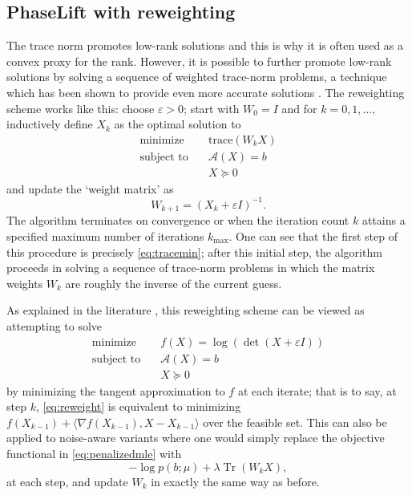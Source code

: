 \documentclass[11pt]{article}
\newcommand{\<}{\langle}
\renewcommand{\>}{\rangle}
\newcommand{\cA}{\mathcal{A}}
\newcommand{\trace}{\operatorname{Tr}}
\numberwithin{equation}{section}
\renewcommand{\epsilon}{\varepsilon}
\begin{document}
\subsection{PhaseLift with reweighting}
\label{sec:reweight}

The trace norm promotes low-rank solutions and this is why it is often
used as a convex proxy for the rank. However, it is possible to
further promote low-rank solutions by solving a sequence
of weighted trace-norm problems, a technique which has been shown to
provide even more accurate solutions \cite{FHB03,CWB07}. The
reweighting scheme works like this: choose $\epsilon > 0$; start with
$W_0 = I$ and for $k = 0, 1, \ldots,$ inductively define $X_k$ as the
optimal solution to
\begin{equation}
\label{eq:reweight}
 \begin{array}{ll}
    \text{minimize}   & \quad \text{trace}(W_k X)\\ 
    \text{subject to} & \quad  \cA(X) = b\\
& \quad X \succeq 0 
\end{array}
\end{equation}
and update the `weight matrix' as
\[
W_{k+1} = (X_k + \epsilon I)^{-1}. 
\]
The algorithm terminates on convergence or when the iteration count
$k$ attains a specified maximum number of iterations
$k_{\text{max}}$. One can see that the first step of this procedure is
precisely \eqref{eq:tracemin}; after this initial step, the algorithm
proceeds in solving a sequence of trace-norm problems in which the
matrix weights $W_k$ are roughly the inverse of the current guess.

As explained in the literature \cite{FHB03,Faz02}, this
reweighting scheme can be viewed as attempting to solve 
\begin{equation}
\label{eq:logdet}
 \begin{array}{ll}
   \text{minimize}   & \quad f(X) =  \log(\det(X + \epsilon I)) \\ 
   \text{subject to} & \quad  \cA(X) = b\\
   & \quad X \succeq 0 
\end{array}
\end{equation}
by minimizing the tangent approximation to $f$ at each iterate; that is
to say, at step $k$, \eqref{eq:reweight} is equivalent to minimizing
$f(X_{k-1}) + \<\nabla f(X_{k-1}), X - X_{k-1}\>$ over the feasible
set. This can also be applied to noise-aware variants where one would
simply replace the objective functional in \eqref{eq:penalizedmle}
with
\[
-\log p(b; \mu) + \lambda \trace(W_k X),
\]
at each step, and update $W_k$ in exactly the same way as before.
\end{document}
